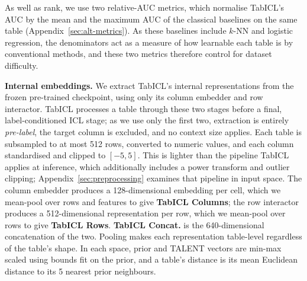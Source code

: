 \documentclass{article}
\begin{document}
As well as rank, we use two relative-AUC metrics, which normalise TabICL's AUC by the mean and the maximum AUC of the classical baselines on the same table (Appendix~\ref{sec:alt-metrics}).
As these baselines include $k$-NN and logistic regression, the denominators act as a measure of how learnable each table is by conventional methods, and these two metrics therefore control for dataset difficulty.


\textbf{Internal embeddings.} We extract TabICL's internal representations from the frozen pre-trained checkpoint, using only its column embedder and row interactor.
TabICL processes a table through these two stages before a final, label-conditioned ICL stage; as we use only the first two, extraction is entirely \textit{pre-label}, the target column is excluded, and no context size applies.
Each table is subsampled to at most 512 rows, converted to numeric values, and each column standardised and clipped to $[-5, 5]$.
This is lighter than the pipeline TabICL applies at inference, which additionally includes a power transform and outlier clipping; Appendix~\ref{sec:preprocessing} examines that pipeline in input space.
The column embedder produces a 128-dimensional embedding per cell, which we mean-pool over rows and features to give \textbf{TabICL Columns}; the row interactor produces a 512-dimensional representation per row, which we mean-pool over rows to give \textbf{TabICL Rows}.
\textbf{TabICL Concat.} is the 640-dimensional concatenation of the two.
Pooling makes each representation table-level regardless of the table's shape.
In each space, prior and TALENT vectors are min-max scaled using bounds fit on the prior, and a table's distance is its mean Euclidean distance to its 5 nearest prior neighbours.
\end{document}
